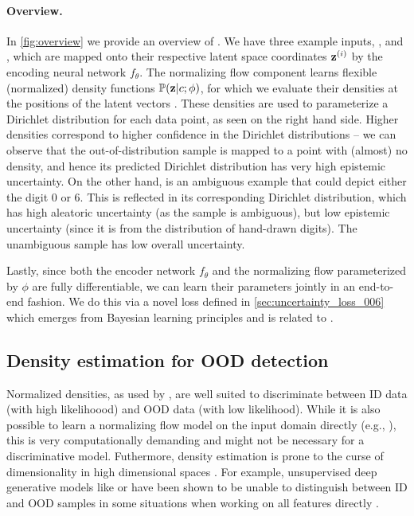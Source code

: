 \paragraph{Overview.} In \cref{fig:overview} we provide an overview of \PostNet. We have three example inputs,  , and , which are mapped onto their respective latent space coordinates $\latent\dataix$ by the encoding neural network $f_\theta$. The normalizing flow component learns flexible (normalized) density functions $\mathbb{P}(\bold{z}|c;\phi)$, for which we evaluate their densities at the positions of the latent vectors \smash{$\latent\dataix$}. These densities are used to parameterize a Dirichlet distribution for each data point, as seen on the right hand side. Higher densities correspond to higher confidence in the Dirichlet distributions -- we can observe that the out-of-distribution sample  is mapped to a point with (almost) no density, and hence its predicted Dirichlet distribution has very high epistemic uncertainty. On the other hand,  is an ambiguous example that could depict either the digit 0 or 6. This is reflected in its corresponding Dirichlet distribution, which has high aleatoric uncertainty (as the sample is ambiguous), but low epistemic uncertainty (since it is from the distribution of hand-drawn digits). The unambiguous sample  has low overall uncertainty.

Lastly, since both the encoder network $f_\theta$ and the normalizing flow parameterized by $\phi$ are fully differentiable, we can learn their parameters jointly in an end-to-end fashion. We do this via a novel loss  defined in \cref{sec:uncertainty_loss_006} which emerges from Bayesian learning principles \cite{PAC-bayesian_estimator} and is related to \UCEacro \cite{uceloss}.

\subsection{Density estimation for OOD detection}

Normalized densities, as used by \PostNetacro, are well suited to discriminate between ID data (with high likelihoood) and OOD data (with low likelihood). While it is also possible to learn a normalizing flow model on the input domain directly (e.g., \cite{maf, why-nf-fail-ood, grathwohl2018scalable}), this is very computationally demanding and might not be necessary for a discriminative model. Futhermore, density estimation is prone to the curse of dimensionality in high dimensional spaces \cite{typicality_OOD_generative, anomaly-detection}. For example, unsupervised deep generative models like \cite{glow} or \cite{pixel_cnn} have been shown to be unable to distinguish between ID and OOD samples in some situations when working on all features directly \cite{deep-generative, energy_based_classifier}. 

